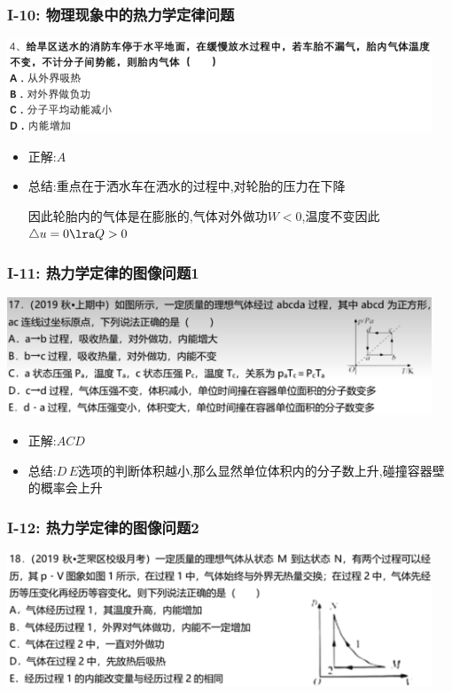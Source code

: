 \documentclass{article}
\begin{document}
\subsubsection{I-10: 物理现象中的热力学定律问题}
\includegraphics[width = 0.95\textwidth,keepaspectratio]{./pictures/2.3-32.png}

\begin{itemize}
    \item 正解:\quad $A$
    \item 总结:\quad 重点在于洒水车在洒水的过程中,对轮胎的压力在下降
    
    \hspace{2.7em} 因此轮胎内的气体是在膨胀的,气体对外做功$W < 0$,温度不变因此$\triangle u = 0 \lra Q > 0$
\end{itemize}

\vspace{2em}

\subsubsection{I-11: 热力学定律的图像问题1}
\includegraphics[width = 0.95\textwidth,keepaspectratio]{./pictures/2.3-33.png}

\begin{itemize}
    \item 正解:\quad $ACD$
    \item 总结:\quad $D \, E$选项的判断体积越小,那么显然单位体积内的分子数上升,碰撞容器壁的概率会上升
\end{itemize}

\vspace{2em}

\subsubsection{I-12: 热力学定律的图像问题2}
\includegraphics[width = 0.95\textwidth,keepaspectratio]{./pictures/2.3-34.png}
\end{document}
